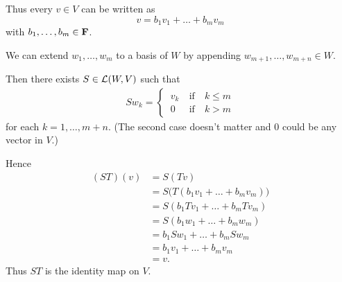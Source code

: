 \documentclass[a5paper]{article}
\begin{document}
    Thus every $v \in V$ can be written as
\begin{equation*}
        v = b_1v_1 + \dots + b_mv_m
\end{equation*}
    with $b_1,\dots,b_m \in \mathbf{F}$.

    We can extend $w_1,\dots,w_m$ to a basis of $W$ by appending $w_{m+1},\dots,w_{m+n} \in W$.

    Then there exists $S \in \mathcal{L}(W,V)$ such that
\begin{align*}
        Sw_k =
            \begin{cases}
                \ v_k \ &\text{if}\quad k \le m \\
                \ 0   \ &\text{if}\quad k  >  m
            \end{cases}
\end{align*}
    for each $k = 1,\dots,m+n$.
    (The second case doesn't matter and 0 could be any vector in $V$.)

    Hence
\begin{align*}
        (ST)(v) &= S(Tv) \\
                &= S \big( T(b_1v_1 + \dots + b_mv_m) \big) \\
                &= S (b_1Tv_1 + \dots + b_mTv_m ) \\
                &= S(b_1w_1 + \dots + b_mw_m) \\
                &= b_1Sw_1 + \dots + b_mSw_m \\
                &= b_1v_1 + \dots + b_mv_m \\
                &= v .
\end{align*}
    Thus $ST$ is the identity map on $V$.
\end{document}
